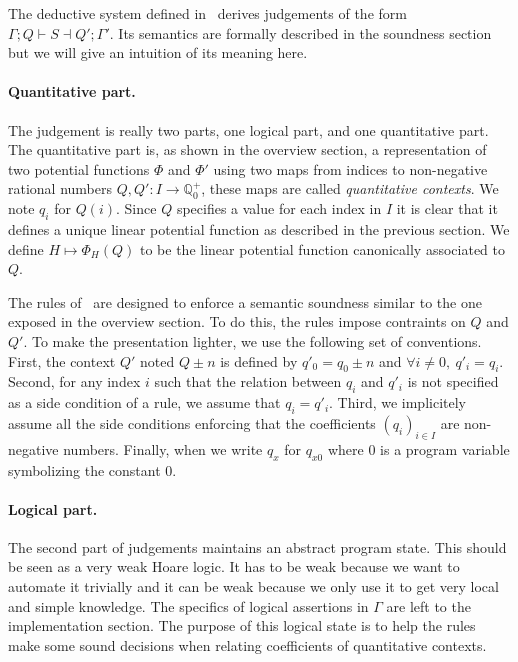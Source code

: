 \documentclass[nocopyrightspace,preprint]{sigplanconf}
\newcommand{\pref}[1]{\prettyref{#1}}
\begin{document}
The deductive system defined in~\pref{fig:proof} derives
judgements of the form $\Gamma; Q \vdash S \dashv Q'; \Gamma'$.
Its semantics are formally described in the soundness section but we
will give an intuition of its meaning here.

\paragraph{Quantitative part.}
The judgement is really two parts, one logical part, and one quantitative
part.  The quantitative part is, as shown in the overview section, a
representation of two potential functions $\Phi$ and $\Phi'$ using
two maps from indices to non-negative rational numbers
$Q, Q' : I \rightarrow \mathbb Q_0^+$, these maps are called
\emph{quantitative contexts}.
We note $q_i$ for $Q(i)$.  Since $Q$ specifies a value for each
index in $I$ it is clear that it defines a unique linear potential function
as described in the previous section. We define $H \mapsto \Phi_H(Q)$
to be the linear potential function canonically associated to $Q$.

The rules of~\pref{fig:proof} are designed to enforce a semantic
soundness similar to the one exposed in the overview section.  To
do this, the rules impose contraints on $Q$ and $Q'$.  To make the
presentation lighter, we use the following  set of conventions.
First, the context $Q'$ noted $Q \pm n$ is defined by $q'_0 = q_0 \pm n$
and $\forall i \neq 0,~q'_i = q_i$.  Second, for any index $i$ such that
the relation between $q_i$ and $q'_i$ is not specified as a side condition
of a rule, we assume that $q_i = q'_i$.  Third, we implicitely assume
all the side conditions enforcing that the coefficients $(q_i)_{i \in I}$ are
non-negative numbers. Finally, when we write $q_x$ for $q_{x0}$ where
0 is a program variable symbolizing the constant 0.

\paragraph{Logical part.}
The second part of judgements maintains an abstract program state.
This should be seen as a very weak Hoare logic.  It has to be weak because
we want to automate it trivially and it can be weak because we only use
it to get very local and simple knowledge.  The specifics of logical assertions
in $\Gamma$ are left to the implementation section.
%
The purpose of this logical state is to help the rules
make some sound decisions when relating coefficients of quantitative
contexts.
\end{document}
